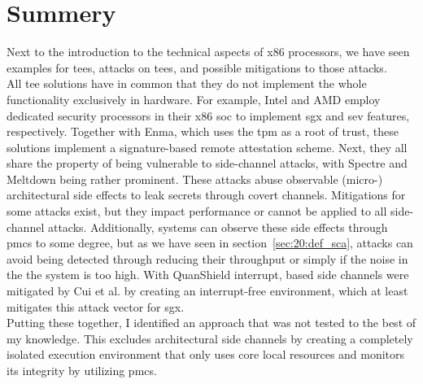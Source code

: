 \section{Summery}
Next to the introduction to the technical aspects of x86 processors, we have seen
examples for \glspl{tee}, attacks on \glspl{tee}, and possible mitigations to
those attacks. \\

All \gls{tee} solutions have in common that they do not implement the whole
functionality exclusively in hardware. For example, Intel and AMD employ
dedicated security processors in their x86 \gls{soc} to implement \gls{sgx} and
\gls{sev} features, respectively. Together with Enma, which uses the \gls{tpm}
as a root of trust, these solutions implement a signature-based remote
attestation scheme. Next, they all share the property of being vulnerable to
side-channel attacks, with Spectre and Meltdown being rather prominent. These
attacks abuse observable (micro-) architectural side effects to leak secrets
through covert channels. Mitigations for some attacks exist, but they impact
performance or cannot be applied to all side-channel attacks. Additionally,
systems can observe these side effects through \glspl{pmc} to some degree, but
as we have seen in section~\ref{sec:20:def_sca}, attacks can avoid being
detected through reducing their throughput or simply if the noise in the the
system is too high. With QuanShield interrupt, based side channels were
mitigated by Cui et al. by creating an interrupt-free environment, which at
least mitigates this attack vector for \gls{sgx}.\\

Putting these together, I identified an approach that was not tested to the best
of my knowledge. This excludes architectural side channels by creating a
completely isolated execution environment that only uses core local resources
and monitors its integrity by utilizing \glspl{pmc}.
